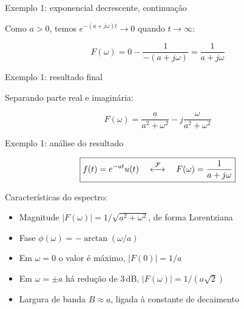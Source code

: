 
\begin{frame}{Exemplo 1: exponencial decrescente, continuação}

Como $a > 0$, temos $e^{-(a+j\omega)t} \to 0$ quando $t \to \infty$:

\[
F(\omega) = 0 - \frac{1}{-(a+j\omega)} = \frac{1}{a+j\omega}
\]


\end{frame}


\begin{frame}{Exemplo 1: resultado final}

Separando parte real e imaginária:

\[
\boxed{F(\omega) = \frac{a}{a^2+\omega^2} - j\frac{\omega}{a^2+\omega^2}}
\]

\vspace{0.3cm}



\end{frame}


\begin{frame}{Exemplo 1: análise do resultado}

\[
\boxed{f(t) = e^{-at}u(t) \quad \mathrel{\overset{\mathcal{F}}{\longleftrightarrow}} \quad F(\omega) = \frac{1}{a+j\omega}}
\]

Características do espectro:

\begin{itemize}
\item<2-> Magnitude $|F(\omega)| = 1/\sqrt{a^2+\omega^2}$, de forma Lorentziana
\item<3-> Fase $\phi(\omega) = -\arctan(\omega/a)$
\item<4-> Em $\omega = 0$ o valor é máximo, $|F(0)| = 1/a$
\item<5-> Em $\omega = \pm a$ há redução de 3\,dB, $|F(\omega)| = 1/(a\sqrt{2})$
\item<6-> Largura de banda $B \approx a$, ligada à constante de decaimento
\end{itemize}

\vspace{0.3cm}


\end{frame}

